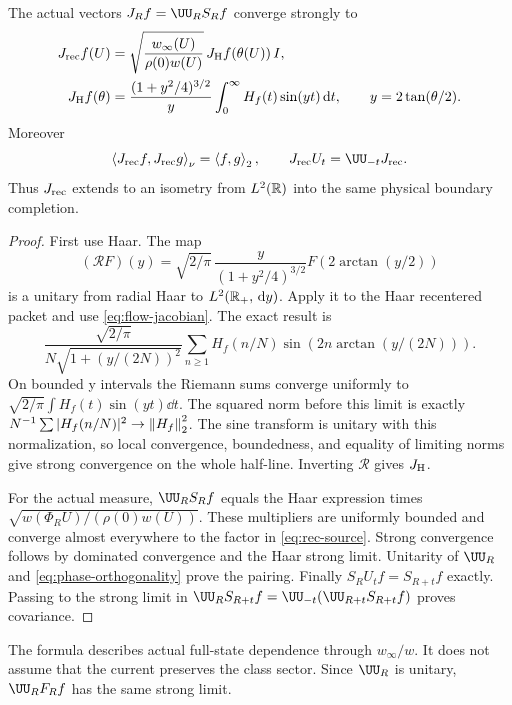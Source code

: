 \begin{theorem}\label{thm:recentering}
The actual vectors $J_Rf=\UU_RS_Rf$ converge strongly to
\begin{align}
J_{\rm rec}f(U)
 &=\sqrt{\frac{w_\infty(U)}{\rho(0)w(U)}}\,
                    J_{\rm H}f(\theta(U))\,I,\label{eq:rec-source}\\
J_{\rm H}f(\theta)
 &=\frac{(1+y^2/4)^{3/2}}{y}
           \int_0^\infty H_f(t)\sin(yt)\,\mathrm d t,
\qquad y=2\tan(\theta/2).
\end{align}
Moreover
\begin{equation}\label{eq:rec-pair}
\ip{J_{\rm rec}f}{J_{\rm rec}g}_\nu=\ip f g_2,\qquad
J_{\rm rec}U_t=\UU_{-t}J_{\rm rec}.
\end{equation}
Thus $J_{\rm rec}$ extends to an isometry from $L^2(\mathbb R)$ into
the same physical boundary completion.
\end{theorem}
\begin{proof}
First use Haar. The map
\begin{equation}
(\mathcal RF)(y)=\sqrt{2/\pi}\,
\frac{y}{(1+y^2/4)^{3/2}}F(2\arctan(y/2))
\end{equation}
is a unitary from radial Haar \Ltwo{} to $L^2(\mathbb R_+,\,\mathrm d y)$.
Apply it to the Haar recentered packet and use
\eqref{eq:flow-jacobian}. The exact result is
\begin{equation}\label{eq:rec-riemann}
\frac{\sqrt{2/\pi}}{N\sqrt{1+(y/(2N))^2}}
\sum_{n\ge1}H_f(n/N)
          \sin\!\left(2n\arctan(y/(2N))\right).
\end{equation}
On bounded y intervals the Riemann sums converge uniformly to
$\sqrt{2/\pi}\int H_f(t)\sin(yt)\dd t$.
The squared norm before this limit is exactly
$N^{-1}\sum|H_f(n/N)|^2\to\left\lVert H_f\right\rVert_2^2$.
The sine transform is unitary with this normalization, so
local convergence, boundedness, and equality of limiting norms
give strong convergence on the whole half-line.
Inverting $\mathcal R$ gives $J_{\rm H}$.

For the actual measure, $\UU_RS_Rf$ equals the Haar expression
times $\sqrt{w(\Phi_RU)/(\rho(0)w(U))}$. These multipliers
are uniformly bounded and converge almost everywhere to the
factor in \eqref{eq:rec-source}. Strong convergence follows
by dominated convergence and the Haar strong limit. Unitarity
of $\UU_R$ and \eqref{eq:phase-orthogonality} prove the pairing.
Finally $S_RU_tf=S_{R+t}f$ exactly. Passing to the strong
limit in
$\UU_RS_{R+t}f=\UU_{-t}(\UU_{R+t}S_{R+t}f)$ proves covariance.
\end{proof}
The formula describes actual full-state dependence through
$w_\infty/w$. It does not assume that the current preserves
the class sector. Since $\UU_R$ is unitary,
$\UU_RF_Rf$ has the same strong limit.

